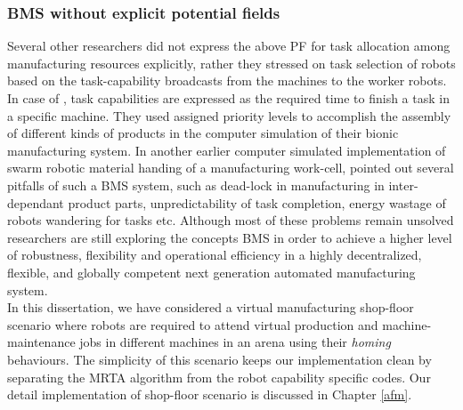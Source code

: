 \subsubsection*{BMS without explicit potential fields}
Several other researchers did not express the above PF for task allocation among manufacturing resources explicitly, rather they stressed on task selection of robots based on the task-capability broadcasts from the machines to the worker robots. In case of \cite{Lazinica+2007}, task capabilities are expressed as the required time to finish a task in a specific machine. They used assigned priority levels to accomplish the assembly of different kinds of products in the computer simulation of their bionic manufacturing system. In another earlier computer simulated implementation of swarm robotic material handing of a manufacturing work-cell, \cite{Doty+1993} pointed out several pitfalls of such a BMS system, such as dead-lock in manufacturing in inter-dependant product parts, unpredictability of task completion, energy wastage of robots wandering for tasks etc. Although most of these problems remain unsolved researchers are still exploring the concepts BMS in order to achieve a higher level of robustness, flexibility and operational efficiency in a highly decentralized, flexible, and globally competent next generation automated manufacturing system.\\
In this dissertation, we have considered a virtual manufacturing shop-floor scenario where robots are required to attend virtual production and machine-maintenance jobs in different machines in an arena using their {\em homing} behaviours. The simplicity of this scenario keeps our implementation clean by separating the MRTA algorithm from the robot capability specific codes. Our detail implementation of shop-floor scenario is discussed in Chapter \ref{afm}.
 